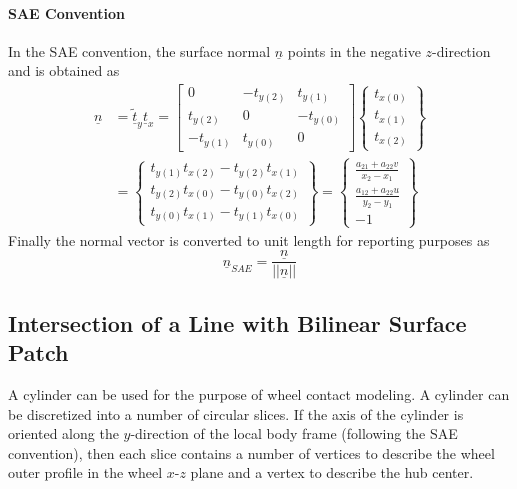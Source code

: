\documentclass[
10pt, %
a4paper, %
oneside, %
headinclude,footinclude, %
BCOR5mm, %
]{scrartcl}
\begin{document}
\paragraph{SAE Convention}
In the SAE convention, the surface normal $\underline{n}$ points in the negative $z$-direction and is obtained as
\begin{equation}
  \begin{split}
  \underline{n} &= \underline{\tilde{t}}_y \underline{t}_x = \begin{bmatrix}
    0        & -t_{y(2)} & t_{y(1)}\\
    t_{y(2)} & 0         & -t_{y(0)}\\
    -t_{y(1)} & t_{y(0)} & 0
 \end{bmatrix}
 \begin{Bmatrix} t_{x(0)} \\ t_{x(1)} \\ t_{x(2)}  \end{Bmatrix}\\
  &= \begin{Bmatrix}
  t_{y(1)}t_{x(2)} - t_{y(2)} t_{x(1)} \\
  t_{y(2)}t_{x(0)} - t_{y(0)} t_{x(2)} \\
  t_{y(0)}t_{x(1)} - t_{y(1)} t_{x(0)}
  \end{Bmatrix} =
  \begin{Bmatrix}
     \frac{a_{21} + a_{22}v}{x_2 - x_1} \\
     \frac{a_{12} + a_{22}u}{y_2 - y_1} \\
    -1
  \end{Bmatrix}
\end{split}
\end{equation}
Finally the normal vector is converted to unit length for reporting purposes as
\begin{equation}
  \underline{n}_{SAE} = \frac{\underline{n}}{\lvert \lvert{\underline{n}}\rvert \rvert}
\end{equation}


\subsection{Intersection of a Line with Bilinear Surface Patch}
A cylinder can be used for the purpose of wheel contact modeling. A cylinder can be discretized into a number of circular slices. If the axis of the cylinder is oriented along the $y$-direction of the local body frame (following the SAE convention), then each slice contains a number of vertices to describe the wheel outer profile in the wheel $x$-$z$ plane and a vertex to describe the hub center.
\end{document}
